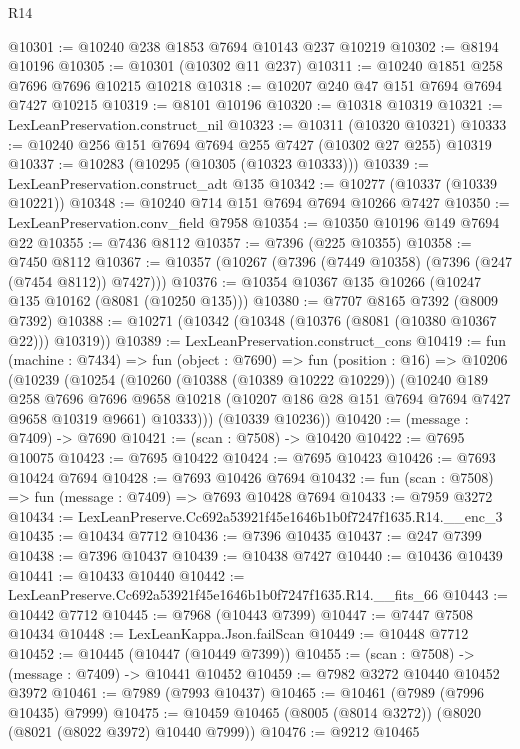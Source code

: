 \begin{lexlean}{R14}
\begin{coremodule}
@10301 := @10240 @238 @1853 @7694 @10143 @237 @10219
@10302 := @8194 @10196
@10305 := @10301 (@10302 @11 @237)
@10311 := @10240 @1851 @258 @7696 @7696 @10215 @10218
@10318 := @10207 @240 @47 @151 @7694 @7694 @7427 @10215
@10319 := @8101 @10196
@10320 := @10318 @10319
@10321 := LexLeanPreservation.construct_nil
@10323 := @10311 (@10320 @10321)
@10333 := @10240 @256 @151 @7694 @7694 @255 @7427 (@10302 @27 @255) @10319
@10337 := @10283 (@10295 (@10305 (@10323 @10333)))
@10339 := LexLeanPreservation.construct_adt @135
@10342 := @10277 (@10337 (@10339 @10221))
@10348 := @10240 @714 @151 @7694 @7694 @10266 @7427
@10350 := LexLeanPreservation.conv_field @7958
@10354 := @10350 @10196 @149 @7694 @22
@10355 := @7436 @8112
@10357 := @7396 (@225 @10355)
@10358 := @7450 @8112
@10367 := @10357 (@10267 (@7396 (@7449 @10358) (@7396 (@247 (@7454 @8112)) @7427)))
@10376 := @10354 @10367 @135 @10266 (@10247 @135 @10162 (@8081 (@10250 @135)))
@10380 := @7707 @8165 @7392 (@8009 @7392)
@10388 := @10271 (@10342 (@10348 (@10376 (@8081 (@10380 @10367 @22))) @10319))
@10389 := LexLeanPreservation.construct_cons
@10419 := fun (machine : @7434) =>
  fun (object : @7690) =>
  fun (position : @16) =>
  @10206
    (@10239
      (@10254
        (@10260
          (@10388 (@10389 @10222 @10229))
          (@10240
            @189
            @258
            @7696
            @7696
            @9658
            @10218
            (@10207 @186 @28 @151 @7694 @7694 @7427 @9658 @10319 @9661)
            @10333)))
      (@10339 @10236))
@10420 := (message : @7409) -> @7690
@10421 := (scan : @7508) -> @10420
@10422 := @7695 @10075
@10423 := @7695 @10422
@10424 := @7695 @10423
@10426 := @7693 @10424 @7694
@10428 := @7693 @10426 @7694
@10432 := fun (scan : @7508) => fun (message : @7409) => @7693 @10428 @7694
@10433 := @7959 @3272
@10434 := LexLeanPreserve.Cc692a53921f45e1646b1b0f7247f1635.R14.__enc_3
@10435 := @10434 @7712
@10436 := @7396 @10435
@10437 := @247 @7399
@10438 := @7396 @10437
@10439 := @10438 @7427
@10440 := @10436 @10439
@10441 := @10433 @10440
@10442 := LexLeanPreserve.Cc692a53921f45e1646b1b0f7247f1635.R14.__fits_66
@10443 := @10442 @7712
@10445 := @7968 (@10443 @7399)
@10447 := @7447 @7508 @10434
@10448 := LexLeanKappa.Json.failScan
@10449 := @10448 @7712
@10452 := @10445 (@10447 (@10449 @7399))
@10455 := (scan : @7508) -> (message : @7409) -> @10441 @10452
@10459 := @7982 @3272 @10440 @10452 @3972
@10461 := @7989 (@7993 @10437)
@10465 := @10461 (@7989 (@7996 @10435) @7999)
@10475 := @10459 @10465 (@8005 (@8014 @3272)) (@8020 (@8021 (@8022 @3972) @10440 @7999))
@10476 := @9212 @10465

\end{coremodule}
\end{lexlean}
